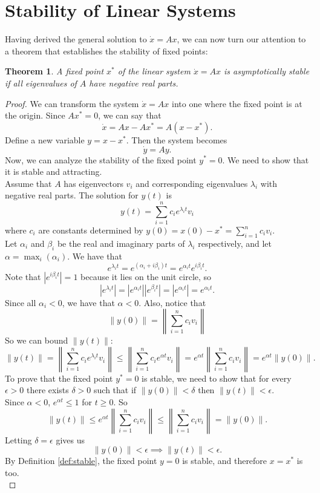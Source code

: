 \documentclass[12pt]{article}
\newtheorem{theorem}{Theorem}[section]
\newcommand{\dx}{\dot{x}}
\newcommand{\dy}{\dot{y}}
\begin{document}
\section{Stability of Linear Systems}

Having derived the general solution to $\dx = Ax$, we can now turn our attention to a theorem that establishes the stability of fixed points:

\begin{theorem}
A fixed point $x^*$ of the linear system $\dx = Ax$ is asymptotically stable if all eigenvalues of $A$ have negative real parts.
\end{theorem}

\begin{proof}
We can transform the system $\dx = Ax$ into one where the fixed point is at the origin. Since $Ax^* = 0$, we can say that
$$\dx = Ax - Ax^* = A(x - x^*).$$
Define a new variable $y = x - x^*$. Then the system becomes
$$\dy = Ay.$$
Now, we can analyze the stability of the fixed point $y^* = 0$. We need to show that it is stable and attracting. \\

Assume that $A$ has eigenvectors $v_i$ and corresponding eigenvalues $\lambda_i$ with negative real parts. The solution for $y(t)$ is
$$y(t) = \sum_{i = 1}^n c_i e^{\lambda_i t} v_i$$
where $c_i$ are constants determined by $y(0) = x(0) - x^* = \sum_{i = 1}^n c_iv_i$. \\

Let $\alpha_i$ and $\beta_i$ be the real and imaginary parts of $\lambda_i$ respectively, and let $\alpha = \max_i(\alpha_i)$. We have that
$$e^{\lambda_i t} = e^{(\alpha_i + i\beta_i)t} = e^{\alpha_i t}e^{i\beta_i t}.$$
Note that $|e^{i\beta_i t}| = 1$ because it lies on the unit circle, so
$$|e^{\lambda_i t}| = |e^{\alpha_i t}||e^{\beta_i t}| = |e^{\alpha_i t}| = e^{\alpha_i t}.$$
Since all $\alpha_i < 0$, we have that $\alpha < 0$. Also, notice that
$$\|y(0)\| = \left\|\sum_{i = 1}^n c_iv_i\right\|$$
So we can bound $\|y(t)\|$:
$$\|y(t)\| = \left\|\sum_{i = 1}^n c_i e^{\lambda_i t}v_i\right\| \le \left\|\sum_{i = 1}^n c_i e^{\alpha t} v_i\right\| = e^{\alpha t}\left\|\sum_{i = 1}^n c_iv_i\right\| = e^{\alpha t}\|y(0)\|.$$
To prove that the fixed point $y^* = 0$ is stable, we need to show that for every $\epsilon > 0$ there exists $\delta > 0$ such that if $\|y(0)\| < \delta$ then $\|y(t)\| < \epsilon$. \\

Since $\alpha < 0$, $e^{\alpha t} \le 1$ for $t \ge 0$. So
$$\|y(t)\| \le e^{\alpha t}\left\|\sum_{i = 1}^n c_iv_i\right\| \le \left\|\sum_{i = 1}^n c_iv_i\right\| = \|y(0)\|.$$
Letting $\delta = \epsilon$ gives us
$$\|y(0)\| < \epsilon \implies \|y(t)\| < \epsilon.$$
By Definition \ref{def:stable}, the fixed point $y = 0$ is stable, and therefore $x = x^*$ is too. \\


\end{proof}
\end{document}
